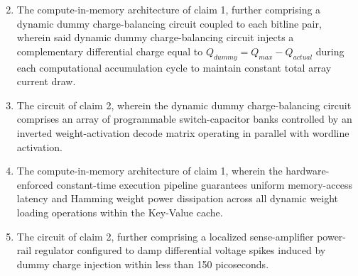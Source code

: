 \documentclass[11pt,a4paper]{article}
\begin{document}
\begin{enumerate}
  \setcounter{enumi}{1}
  \item The compute-in-memory architecture of claim 1, further comprising a dynamic dummy charge-balancing circuit coupled to each bitline pair, wherein said dynamic dummy charge-balancing circuit injects a complementary differential charge equal to $Q_{dummy} = Q_{max} - Q_{actual}$ during each computational accumulation cycle to maintain constant total array current draw.

  \item The circuit of claim 2, wherein the dynamic dummy charge-balancing circuit comprises an array of programmable switch-capacitor banks controlled by an inverted weight-activation decode matrix operating in parallel with wordline activation.

  \item The compute-in-memory architecture of claim 1, wherein the hardware-enforced constant-time execution pipeline guarantees uniform memory-access latency and Hamming weight power dissipation across all dynamic weight loading operations within the Key-Value cache.

  \item The circuit of claim 2, further comprising a localized sense-amplifier power-rail regulator configured to damp differential voltage spikes induced by dummy charge injection within less than 150 picoseconds.
\end{enumerate}
\end{document}
